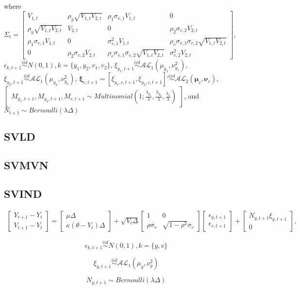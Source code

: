 \documentclass{article}
\begin{document}
where $\Sigma_{t} = \begin{bmatrix} V_{1,t} & \rho_y \sqrt{V_{1,t}V_{2,t}} & \rho_1 \sigma_{v,1} V_{1,t} & 0 \\ \rho_y \sqrt{V_{1,t}V_{2,t}} & V_{2,t} & 0 & \rho_2 \sigma_{v,2} V_{2,t} \\ \rho_1 \sigma_{v,1} V_{1,t} & 0 & \sigma_{v,1}^2 V_{1,t} & \rho_v \sigma_{v,1}\sigma_{v,2} \sqrt{V_{1,t} V_{2,t}} \\ 0 & \rho_2 \sigma_{v,2} V_{2,t} & \rho_v \sigma_{v,1}\sigma_{v,2} \sqrt{V_{1,t} V_{2,t}} & \sigma_{v,2}^2 V_{2,t} \end{bmatrix}$, \\$\epsilon_{k,t+1} \overset{iid}{\sim} N(0,1), k = \{y_1,y_2,v_1,v_2\}$, $\xi_{y_1,t+1} \overset{iid}{\sim} \mathcal{AL}_1(\mu_{y_1}, \nu_{y_1}^2)$, $\xi_{y_2,t+1} \overset{iid}{\sim} \mathcal{AL}_1(\mu_{y_2}, \nu_{y_2}^2)$, $\boldsymbol{\xi}_{c,t+1} = [\xi_{y_1,c,t+1}, \xi_{y_2,c,t+1}]' \overset{iid}{\sim} \mathcal{AL}_2(\boldsymbol{\mu}_c, \boldsymbol{\nu}_c)$, $\begin{bmatrix}
M_{y_1,t+1},M_{y_2,t+1},M_{c,t+1} \sim Multinomial(1;\frac{\lambda_{y_1}}{\lambda},\frac{\lambda_{y_2}}{\lambda},\frac{\lambda_c}{\lambda})
\end{bmatrix}$, and $N_{t+1} \sim Bernoulli(\lambda\Delta)$

\subsection{SVLD}

\subsection{SVMVN}

\subsection{SVIND}
\begin{align}
    \begin{bmatrix} Y_{t+1} - Y_t \\ V_{t+1} - V_t \end{bmatrix} = \begin{bmatrix}\mu\Delta \\ \kappa(\theta - V_{t})\Delta\end{bmatrix}  + \sqrt{V_{t}\Delta} \begin{bmatrix} 1 & 0 \\ \rho \sigma_v & \sqrt{1 - \rho^2} \sigma_v \end{bmatrix} \begin{bmatrix} \epsilon_{y,t+1} \\ \epsilon_{v,t+1} \end{bmatrix} + \begin{bmatrix} N_{y,t+1} \xi_{y,t+1} \\0  \end{bmatrix}, \label{S_tdisc}
\end{align}

$$\epsilon_{k,t+1} \overset{iid}{\sim} N(0,1), k = \{y,v\}$$

$$\xi_{y,t+1} \overset{iid}{\sim} \mathcal{AL}_1(\mu_y, \nu_y^2)$$

$$N_{y,t+1} \sim Bernoulli(\lambda\Delta)$$
\end{document}
